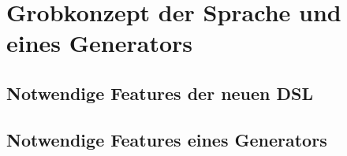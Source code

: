 \chapter{ Grobkonzept der Sprache und eines Generators}
\section{Notwendige Features der neuen DSL}
\section{Notwendige Features eines Generators}